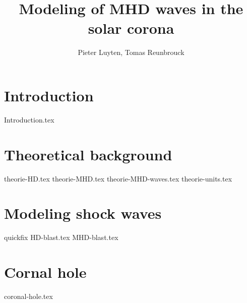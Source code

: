 \documentclass[a4paper]{article}
\title{Modeling of MHD waves in the solar corona}
\author{Pieter Luyten, Tomas Reunbrouck}
\begin{document}
\maketitle
\newpage
\tableofcontents
\newpage

\section{Introduction}
{Introduction.tex}


\section{Theoretical background}
{theorie-HD.tex}
{theorie-MHD.tex}
{theorie-MHD-waves.tex}
{theorie-units.tex}
\newpage

\section{Modeling shock waves}
quickfix
{HD-blast.tex}
{MHD-blast.tex}
\newpage

\section{Cornal hole}
{coronal-hole.tex}

\newpage
\printbibliography
\end{document}
